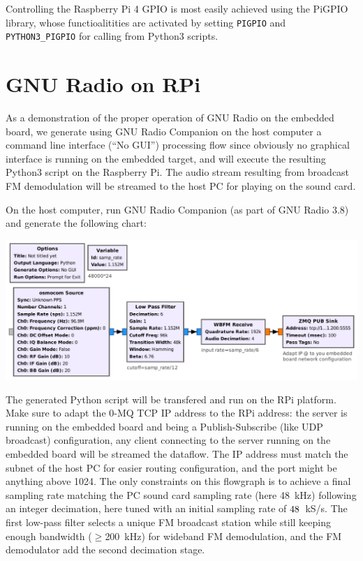 \documentclass[a4paper]{article}
\begin{document}
Controlling the Raspberry Pi 4 GPIO is most easily achieved using the PiGPIO library, whose
functioalitities are activated by setting {\tt PIGPIO} and {\tt PYTHON3\_PIGPIO} for calling
from Python3 scripts.

\section{GNU Radio on RPi}

As a demonstration of the proper operation of GNU Radio on the embedded board, we
generate using GNU Radio Companion on the host computer a command line interface (``No GUI'') processing flow 
since obviously no graphical interface is running on the embedded target, and will execute 
the resulting Python3 script on the Raspberry Pi. The audio stream resulting from broadcast
FM demodulation will be streamed to the host PC for playing on the sound card.

On the host computer, run GNU Radio Companion (as part of GNU Radio 3.8) and generate
the following chart:

\includegraphics[width=\linewidth]{target}

The generated Python script will be transfered and run on the RPi platform. Make sure
to adapt the 0-MQ TCP IP address to the RPi address: the server is running on the embedded board
and being a Publish-Subscribe (like UDP broadcast) configuration, any client connecting to
the server running on the embedded board will be streamed the dataflow. The IP address must
match the subnet of the host PC for easier routing configuration, and the port might be
anything above 1024. The only constraints on this flowgraph is to achieve a final sampling
rate matching the PC sound card sampling rate (here 48~kHz) following an integer decimation,
here tuned with an initial sampling rate of $48\time 24$~kS/s. The first low-pass filter selects
a unique FM broadcast station while still keeping enough bandwidth ($\geq$200~kHz) for
wideband FM demodulation, and the FM demodulator add the second decimation stage.
\end{document}
